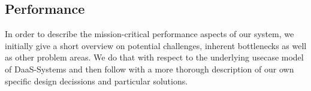 \documentclass[runningheads]{llncs}
\begin{document}
\subsection{Performance}
%
%

In order to describe the mission-critical performance aspects of our system,
we initially give a short overview on potential challenges,
inherent bottlenecks as well as other problem areas.
We do that with respect to the underlying usecase model of DaaS-Systems
and then follow with a more thorough description
of our own specific design decissions and particular solutions.
\end{document}
